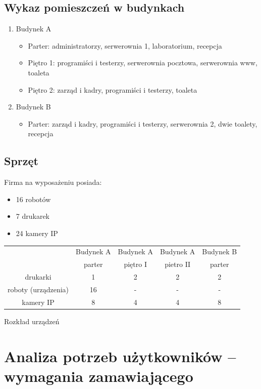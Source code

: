 \documentclass{article}
\begin{document}
\subsection{Wykaz pomieszczeń w budynkach}
\begin{enumerate}
	\item Budynek A
	\begin{itemize}
		\item Parter: administratorzy, serwerownia 1, laboratorium, recepcja
		\item Piętro 1: programiści i testerzy, serwerownia pocztowa, serwerownia www, toaleta
		\item Piętro 2: zarząd i kadry, programiści i testerzy, toaleta
	\end{itemize}
	\item Budynek B
		\begin{itemize}
		\item Parter: zarząd i kadry, programiści i testerzy, serwerownia 2, dwie toalety, recepcja
	\end{itemize}
\end{enumerate}
\subsection{Sprzęt}
Firma na wyposażeniu posiada:
\begin{itemize}
	\item 16 robotów
	\item 7 drukarek
	\item 24 kamery IP
\end{itemize}
\begin{Tabela}[!ht]
	\centering
\begin{tabular}{|c|c|c|c|c|}\hline
	\centering
	& Budynek A & Budynek A & Budynek A & 	Budynek B 	\\
	\centering
 & parter & piętro I & pietro II & parter \\
 \hline
drukarki & 1 & 2 & 2 & 2\\
\hline
roboty (urządzenia) & 16 & - & - & - \\
\hline
kamery IP & 8 & 4 & 4 & 8 \\
\hline
\end{tabular}
\caption{Rozkład urządzeń}
\end{Tabela}
\newpage
\section{Analiza potrzeb użytkowników – wymagania zamawiającego}
\end{document}
